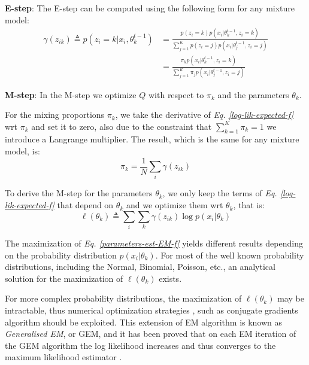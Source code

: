 \noindent
\textbf{E-step}: The E-step can be computed using the following form for any mixture model:
\begin{equation} \label{responsibilities-f}
  \begin{split}
	\gamma(z_{ik}) \triangleq p(z_{i}=k|x_{i},\theta_{k}^{t-1}) & = \frac{p(z_{i}=k)p(x_{i}|\theta_{k}^{t-1},z_{i}=k)}{\sum_{j=1}^{K} p(z_{i}=j)p(x_{i}|\theta_{j}^{t-1},z_{i}=j)} \\
					   & = \frac{\pi_{k}p(x_{i}|\theta_{k}^{t-1},z_{i}=k)}{\sum_{j=1}^{K} \pi_{j}p(x_{i}|\theta_{j}^{t-1},z_{i}=j)}
  \end{split}
\end{equation}

\noindent
\textbf{M-step}: In the M-step we optimize $Q$ with respect to $\pi_{k}$ and the parameters $\theta_{k}$.

For the mixing proportions $\pi_{k}$, we take the derivative of \emph{Eq. \ref{log-lik-expected-f}} wrt $\pi_{k}$ and set it to zero, also due to the constraint that $\sum_{k=1}^{K}\pi_{k} = 1$ we introduce a Langrange multiplier. The result, which is the same for any mixture model, is:
\begin{equation} \label{mixing-proportions-est-f}
		\pi_{k} = \frac{1}{N} \sum_{i} \gamma(z_{ik})
\end{equation}

To derive the M-step for the parameters $\theta_{k}$, we only keep the terms of \emph{Eq. \ref{log-lik-expected-f}} that depend on $\theta_{k}$ and we optimize them wrt $\theta_{k}$, that is:
\begin{equation} \label{parameters-est-EM-f}
		\ell(\theta_{k}) \triangleq \sum_{i} \sum_{k} \gamma(z_{ik}) \log p(x_{i}|\theta_{k})
\end{equation}

The maximization of \emph{Eq. \ref{parameters-est-EM-f}} yields different results depending on the probability distribution $p(x_{i}|\theta_{k})$. For most of the well known probability distributions, including the Normal, Binomial, Poisson, etc., an analytical solution for the maximization of $\ell(\theta_{k})$ exists. 

For more complex probability distributions, the maximization of $\ell(\theta_{k})$ may be intractable, thus numerical optimization strategies \citep{Nocedal2006}, such as conjugate gradients algorithm \citep{Hestenes1952} should be exploited. This extension of EM algorithm is known as \emph{Generalised EM}, or GEM, and it has been proved that on each EM iteration of the GEM algorithm the log likelihood increases and thus converges to the maximum likelihood estimator \citep{Wu1983}.

